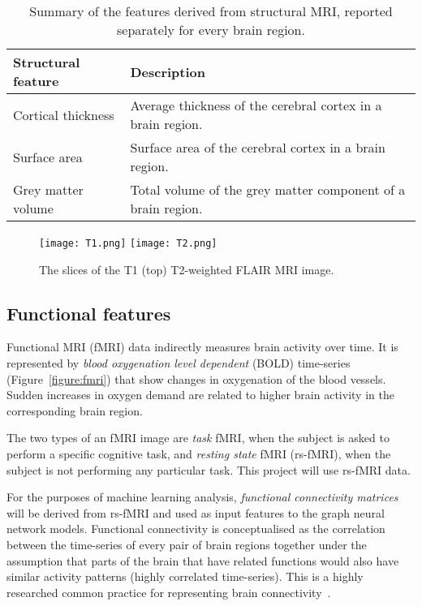\begin{table}[]
\centering
    \caption{Summary of the features derived from structural MRI, reported separately for every brain region.}\label{table:structural-features}
    
    \begin{tabular}{lp{11cm}}
        \hline
    \textbf{Structural feature}            & \textbf{Description} \\ \hline
    Cortical thickness &  Average thickness of the cerebral cortex in a brain region. \\
    Surface area       &  Surface area of the cerebral cortex in a brain region. \\
    Grey matter volume &  Total volume of the grey matter component of a brain region. \\ \hline
    \end{tabular}
\end{table}

\begin{figure}[]
    \centering
    \texttt{[image: T1.png]}
    \texttt{[image: T2.png]}
    \caption{The slices of the T1 (top) T2-weighted FLAIR MRI image.}\label{figure:t1-t2}
\end{figure}


\subsection{Functional features}
\label{fmri}

Functional MRI (fMRI) data indirectly measures brain activity over time. It is represented by \textit{blood oxygenation level dependent} (BOLD) time-series (Figure~\ref{figure:fmri}) that show changes in oxygenation of the blood vessels. Sudden increases in oxygen demand are related to higher brain activity in the corresponding brain region.

The two types of an fMRI image are \textit{task} fMRI, when the subject is asked to perform a specific cognitive task, and \textit{resting state} fMRI (rs-fMRI), when the subject is not performing any particular task. This project will use rs-fMRI data.

For the purposes of machine learning analysis, \textit{functional connectivity matrices} will be derived from rs-fMRI and used as input features to the graph neural network models. Functional connectivity is conceptualised as the correlation between the time-series of every pair of brain regions together under the assumption that parts of the brain that have related functions would also have similar activity patterns (highly correlated time-series). This is a highly researched common practice for representing brain connectivity~\cite{biswal1995functional, smith2009correspondence}.


